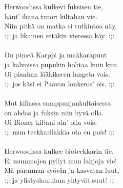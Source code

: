 
Herwoodissa kulkevi fuksisen tie, \\ hänt' ihana tutori kiltahan vie. \\ Niin pitkä on matka ei tutkintoa näy, \\ :;: ja likainen setäkin vieressä käy. :;: \\ \hspace{10mm} \\ On pimeä Karppi ja makkarapuut \\ ja kalvoissa pupukin hohtaa kuin kuu. \\ Oi pianhan lääkikseen langeta vois, \\ :;: jos käsi ei Paavon lonkeros' ois. :;: \\ \hspace{10mm} \\ Mut killassa samppanjankultaisessa \\ on ahdas ja fuksin niin hyvä olla. \\ Oi Bioner kiltani ain' olla vois, \\ :;: mun teekkarilakkia ota en pois! :;: \\ \hspace{10mm} \\ Herwoodissa kulkee bioteekkarin tie. \\ Ei mummojen pyllyt mun lahjoja vie! \\ Mä parannan syövän ja kasvatan luut, \\ :;: ja ylistyslauluhun yhtyvät suut! :;: